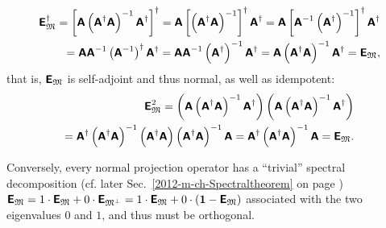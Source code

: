 \begin{equation}
\begin{split}
\textsf{\textbf{E}}_{{\frak M}}^\dagger
=
\left[
\textsf{\textbf{A}}  \left(\textsf{\textbf{A}}^\dagger
\textsf{\textbf{A}} \right)^{-1} \textsf{\textbf{A}}^\dagger
\right]^\dagger
=
\textsf{\textbf{A}} \left[  \left(\textsf{\textbf{A}}^\dagger
\textsf{\textbf{A}} \right)^{-1}\right]^\dagger \textsf{\textbf{A}}^\dagger
=
\textsf{\textbf{A}} \left[ \textsf{\textbf{A}}^{-1}
\left(\textsf{\textbf{A}}^\dagger\right)^{-1} \right]^\dagger \textsf{\textbf{A}}^\dagger \\
=
\textsf{\textbf{A}} \textsf{\textbf{A}}^{-1}
\left(\textsf{\textbf{A}}^{-1}\right)^\dagger  \textsf{\textbf{A}}^\dagger
= \textsf{\textbf{A}} \textsf{\textbf{A}}^{-1}
\left(\textsf{\textbf{A}}^\dagger\right)^{-1}  \textsf{\textbf{A}}^\dagger
= \textsf{\textbf{A}} \left(\textsf{\textbf{A}}^\dagger
\textsf{\textbf{A}}\right)^{-1}  \textsf{\textbf{A}}^\dagger
=  \textsf{\textbf{E}}_{{\frak M}},
\end{split}
\label{2015-m-ch-cfvs-opab6}
\end{equation}
that is, $\textsf{\textbf{E}}_{{\frak M}}$ is self-adjoint and thus normal, as well as idempotent:
\begin{equation}
\begin{split}
\textsf{\textbf{E}}_{{\frak M}}^2
=
\left(
\textsf{\textbf{A}}  \left(\textsf{\textbf{A}}^\dagger
\textsf{\textbf{A}} \right)^{-1} \textsf{\textbf{A}}^\dagger
\right)
\left(
\textsf{\textbf{A}}  \left(\textsf{\textbf{A}}^\dagger
\textsf{\textbf{A}} \right)^{-1} \textsf{\textbf{A}}^\dagger
\right) \\
=
\textsf{\textbf{A}}^\dagger  \left(\textsf{\textbf{A}}^\dagger
\textsf{\textbf{A}} \right)^{-1} \left( \textsf{\textbf{A}}^\dagger
\textsf{\textbf{A}}  \right) \left(\textsf{\textbf{A}} ^\dagger
\textsf{\textbf{A}} \right)^{-1} \textsf{\textbf{A}}
=
\textsf{\textbf{A}}^\dagger   \left(\textsf{\textbf{A}} ^\dagger
\textsf{\textbf{A}} \right)^{-1} \textsf{\textbf{A}}
=
\textsf{\textbf{E}}_{{\frak M}}.
\end{split}
\label{2015-m-ch-cfvs-opab7}
\end{equation}

Conversely, every normal projection operator has a ``trivial'' spectral decomposition
(cf. later Sec.~\ref{2012-m-ch-Spectraltheorem} on page \pageref{2012-m-ch-Spectraltheorem})
$\textsf{\textbf{E}}_{{\frak M}}
=
1 \cdot \textsf{\textbf{E}}_{{\frak M}} + 0 \cdot \textsf{\textbf{E}}_{{\frak M}^\perp}
=
1 \cdot \textsf{\textbf{E}}_{{\frak M}} + 0 \cdot \left(\textbf{1} - \textsf{\textbf{E}}_{{\frak M}}\right)$
associated with the two eigenvalues $0$ and $1$, and thus must be orthogonal.

